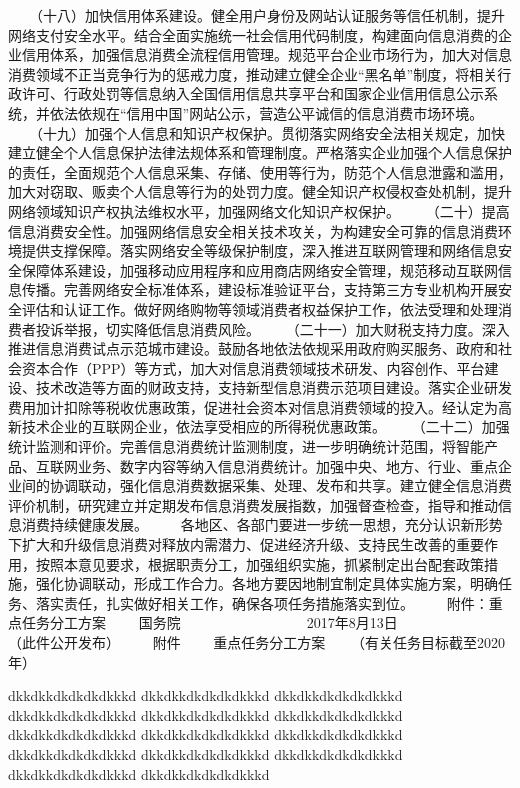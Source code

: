 \documentclass[11pt]{ctexart}
\begin{document}
{{{{　　（十八）加快信用体系建设。健全用户身份及网站认证服务等信任机制，提升网络支付安全水平。结合全面实施统一社会信用代码制度，构建面向信息消费的企业信用体系，加强信息消费全流程信用管理。规范平台企业市场行为，加大对信息消费领域不正当竞争行为的惩戒力度，推动建立健全企业“黑名单”制度，将相关行政许可、行政处罚等信息纳入全国信用信息共享平台和国家企业信用信息公示系统，并依法依规在“信用中国”网站公示，营造公平诚信的信息消费市场环境。
　　（十九）加强个人信息和知识产权保护。贯彻落实网络安全法相关规定，加快建立健全个人信息保护法律法规体系和管理制度。严格落实企业加强个人信息保护的责任，全面规范个人信息采集、存储、使用等行为，防范个人信息泄露和滥用，加大对窃取、贩卖个人信息等行为的处罚力度。健全知识产权侵权查处机制，提升网络领域知识产权执法维权水平，加强网络文化知识产权保护。
　　（二十）提高信息消费安全性。加强网络信息安全相关技术攻关，为构建安全可靠的信息消费环境提供支撑保障。落实网络安全等级保护制度，深入推进互联网管理和网络信息安全保障体系建设，加强移动应用程序和应用商店网络安全管理，规范移动互联网信息传播。完善网络安全标准体系，建设标准验证平台，支持第三方专业机构开展安全评估和认证工作。做好网络购物等领域消费者权益保护工作，依法受理和处理消费者投诉举报，切实降低信息消费风险。
　　（二十一）加大财税支持力度。深入推进信息消费试点示范城市建设。鼓励各地依法依规采用政府购买服务、政府和社会资本合作（PPP）等方式，加大对信息消费领域技术研发、内容创作、平台建设、技术改造等方面的财政支持，支持新型信息消费示范项目建设。落实企业研发费用加计扣除等税收优惠政策，促进社会资本对信息消费领域的投入。经认定为高新技术企业的互联网企业，依法享受相应的所得税优惠政策。
　　（二十二）加强统计监测和评价。完善信息消费统计监测制度，进一步明确统计范围，将智能产品、互联网业务、数字内容等纳入信息消费统计。加强中央、地方、行业、重点企业间的协调联动，强化信息消费数据采集、处理、发布和共享。建立健全信息消费评价机制，研究建立并定期发布信息消费发展指数，加强督查检查，指导和推动信息消费持续健康发展。
　　各地区、各部门要进一步统一思想，充分认识新形势下扩大和升级信息消费对释放内需潜力、促进经济升级、支持民生改善的重要作用，按照本意见要求，根据职责分工，加强组织实施，抓紧制定出台配套政策措施，强化协调联动，形成工作合力。各地方要因地制宜制定具体实施方案，明确任务、落实责任，扎实做好相关工作，确保各项任务措施落实到位。
　　附件：重点任务分工方案
　　国务院 　 　　　　　
　　2017年8月13日　　　　　
　　（此件公开发布）
　　附件
　　重点任务分工方案
　　（有关任务目标截至2020年）
　　

dkkdkkdkdkdkdkkkd
dkkdkkdkdkdkdkkkd
dkkdkkdkdkdkdkkkd
dkkdkkdkdkdkdkkkd
dkkdkkdkdkdkdkkkd
dkkdkkdkdkdkdkkkd
dkkdkkdkdkdkdkkkd
dkkdkkdkdkdkdkkkd
dkkdkkdkdkdkdkkkd
dkkdkkdkdkdkdkkkd
dkkdkkdkdkdkdkkkd
dkkdkkdkdkdkdkkkd
dkkdkkdkdkdkdkkkd
dkkdkkdkdkdkdkkkd
}}}}
\end{document}
